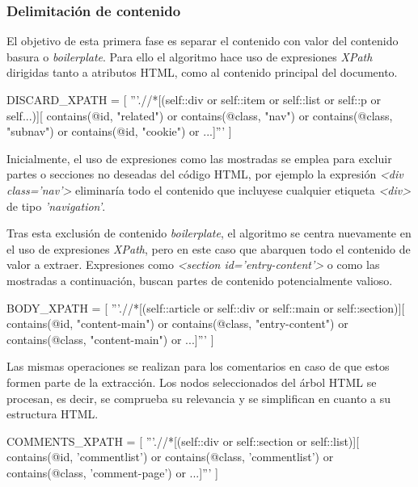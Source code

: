 \subsubsection{Delimitación de contenido}
\label{subsubsec:delimitacion de contenido}

El objetivo de esta primera fase es separar el contenido con valor del contenido basura o
\emph{boilerplate}. Para ello el algoritmo hace uso de expresiones \emph{XPath} dirigidas tanto a atributos 
HTML, como al contenido principal del documento.

\begin{Schunk}
  \begin{Soutput}
    DISCARD_XPATH = [
      '''.//*[(self::div or self::item or self::list or self::p or self...)][
      contains(@id, "related") or contains(@class, "nav") or 
      contains(@class, "subnav") or contains(@id, "cookie") or ...]'''
    ]
  \end{Soutput}
\end{Schunk}

Inicialmente, el uso de expresiones como las mostradas se emplea para excluir partes o secciones no deseadas 
del código HTML, por ejemplo la expresión \emph{<div class='nav'>} eliminaría todo el contenido que incluyese
cualquier etiqueta \emph{<div>} de tipo \emph{'navigation'}.

Tras esta exclusión de contenido \emph{boilerplate}, el algoritmo se centra nuevamente en el uso de 
expresiones \emph{XPath}, pero en este caso que abarquen todo el contenido de valor a extraer. Expresiones 
como \emph{<section id='entry-content'>} o como las mostradas a continuación, buscan partes de contenido
potencialmente valioso.

\begin{Schunk}
  \begin{Soutput}
    BODY_XPATH = [
      '''.//*[(self::article or self::div or self::main or self::section)][
      contains(@id, "content-main") or
      contains(@class, "entry-content") or 
      contains(@class, "content-main") or ...]'''
    ]
  \end{Soutput}
\end{Schunk}

Las mismas operaciones se realizan para los comentarios en caso de que estos formen parte de la extracción. 
Los nodos seleccionados del árbol HTML se procesan, es decir, se comprueba su relevancia y se simplifican 
en cuanto a su estructura HTML.

\begin{Schunk}
  \begin{Soutput}
    COMMENTS_XPATH = [
      '''.//*[(self::div or self::section or self::list)][
      contains(@id, 'commentlist') or 
      contains(@class, 'commentlist') or 
      contains(@class, 'comment-page') or ...]'''
    ]
  \end{Soutput}
\end{Schunk}

